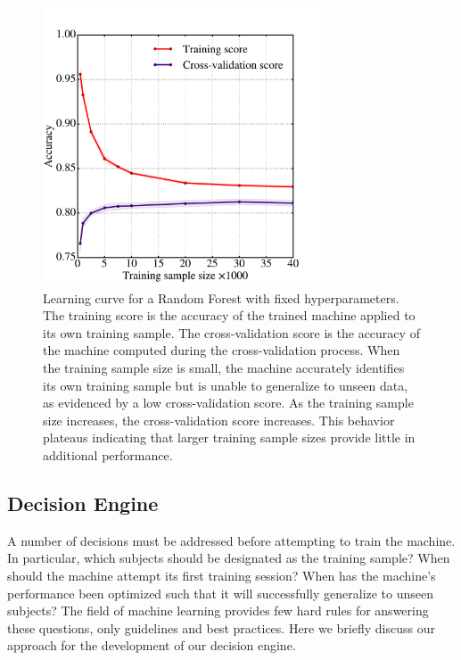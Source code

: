 \documentclass[twocolumn]{aastex6}
\begin{document}
\begin{figure}[t!]
\includegraphics[width=3.25in]{figures/learning_curve_RF.pdf}
\caption{Learning curve for a Random Forest with fixed hyperparameters. The training score is the accuracy of the trained machine applied to its own training sample. The cross-validation score is the accuracy of the machine computed during the cross-validation process. When the training sample size is small, the machine accurately identifies its own training sample but is unable to generalize to unseen data, as evidenced by a low cross-validation score. As the training sample size increases, the cross-validation score increases. This behavior plateaus indicating that larger training sample sizes provide little in additional performance. \label{fig: learning curve}}
\end{figure}


\subsection{Decision Engine}\label{sec: decision engine}
A number of decisions must be addressed before attempting to train the machine. 
In particular, which subjects should be designated as the training sample? 
When should the machine attempt its first training session? 
When has the machine's performance been optimized such that it will successfully
generalize to unseen subjects? The field of machine learning provides few hard rules 
for answering these questions, only guidelines and best practices. 
Here we briefly discuss our approach for the development of our decision engine.
\end{document}
